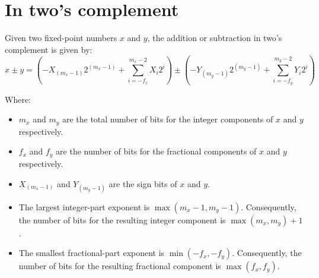 \documentclass[12pt,openany, tikz,border=10pt]{book}
\begin{document}
			      	\newpage
			      	\section{In two's complement}
			      	Given two fixed-point numbers $x$ and $y$, the addition or subtraction in two's complement is given by:
			      	\begin{equation}
			      		x \pm y = \left( -X_{(m_x-1)}2^{(m_x-1)} + \sum_{i=-f_x}^{m_x-2} X_i2^i \right) \pm \left( -Y_{(m_y-1)}2^{(m_y-1)} + \sum_{i=-f_y}^{m_y-2} Y_i2^i \right)
			      	\end{equation}
			      	
			      	Where:
			      	\begin{itemize}
			      		\item[] $m_x$ and $m_y$ are the total number of bits for the integer components of $x$ and $y$ respectively.
			      		\item[] $f_x$ and $f_y$ are the number of bits for the fractional components of $x$ and $y$ respectively.
			      		\item[] $X_{(m_x-1)}$ and $Y_{(m_y-1)}$ are the sign bits of $x$ and $y$.
			      		\item[] The largest integer-part exponent is $\max(m_x - 1, m_y - 1)$. Consequently, the number of bits for the resulting integer component is $\max(m_x, m_y) + 1$.
			      		\item[] The smallest fractional-part exponent is $\min(-f_x, -f_y)$. Consequently, the number of bits for the resulting fractional component is $\max(f_x, f_y)$.
			      	\end{itemize}
			      	
			      	
\end{document}
